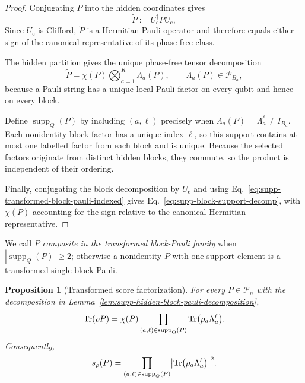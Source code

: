 \documentclass[
  aps,
  prx,
  reprint,
  superscriptaddress,
  amsmath,
  amssymb,
  nofootinbib,
  longbibliography
]{revtex4-2}
\newtheorem{proposition}[theorem]{Proposition}
\newcommand{\supp}{\operatorname{supp}}
\newcommand{\Pc}{\mathcal{P}}
\begin{document}
\begin{proof}
Conjugating $P$ into the hidden coordinates gives
\begin{equation}
\widetilde P:=U_{\mathrm c}^\dagger P U_{\mathrm c},
\end{equation}
Since $U_{\mathrm c}$ is Clifford, $\widetilde P$ is a Hermitian Pauli
operator and therefore equals either sign of the canonical representative of
its phase-free class.

The hidden partition gives the unique phase-free tensor decomposition
\begin{equation}
\widetilde P
=
\chi(P)\bigotimes_{a=1}^K\Lambda_a(P),
\qquad
\Lambda_a(P)\in\Pc_{B_a},
\end{equation}
because a Pauli string has a unique local Pauli factor on every qubit and
hence on every block.

Define $\supp_Q(P)$ by including $(a,\ell)$ precisely when
$\Lambda_a(P)=\Lambda_a^\ell\ne I_{B_a}$.  Each nonidentity block factor has
a unique index $\ell$, so this support contains at most one labelled factor
from each block and is unique.  Because the selected factors originate from
distinct hidden blocks, they commute, so the product is independent of their
ordering.

Finally, conjugating the block decomposition by $U_{\mathrm c}$ and using
Eq.~\eqref{eq:supp-transformed-block-pauli-indexed} gives
Eq.~\eqref{eq:supp-block-support-decomp}, with $\chi(P)$ accounting for the
sign relative to the canonical Hermitian representative.
\end{proof}

We call $P$ \emph{composite in the transformed block-Pauli family} when
$|\supp_Q(P)|\ge2$; otherwise a nonidentity $P$ with one support element is a
transformed single-block Pauli.

\begin{proposition}[Transformed score factorization]
\label{prop:supp-transformed-score-factorization}
For every $P\in\Pc_n$ with the decomposition in
Lemma~\ref{lem:supp-hidden-block-pauli-decomposition},
\begin{equation}
\Tr(\rho P)
=
\chi(P)
\prod_{(a,\ell)\in\supp_Q(P)}
\Tr(\rho_a \Lambda_a^\ell).
\label{eq:supp-block-factorization-exp}
\end{equation}
Consequently,
\begin{equation}
s_\rho(P)
=
\prod_{(a,\ell)\in\supp_Q(P)}
\bigl|\Tr(\rho_a \Lambda_a^\ell)\bigr|^2 .
\label{eq:supp-block-factorization-score}
\end{equation}
\end{proposition}
\end{document}
